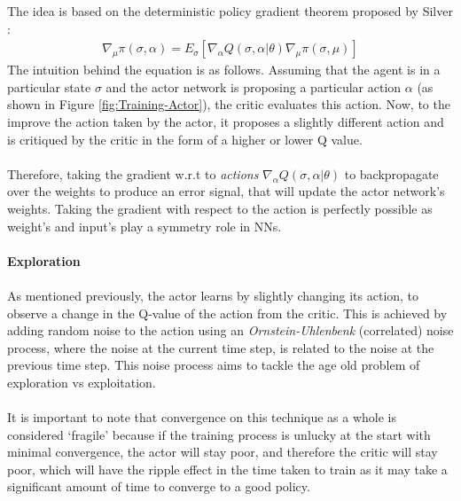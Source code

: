 \documentclass[ %
                    author={Ashwinder Khurana},
                supervisor={Prof Dave Cliff},
                    degree={MEng},
                     title={The Deeply Reinforced Trader},
                  subtitle={},
                      type={enterprise},
                      year={2020} ]{dissertation}
\begin{document}
{\begin{figure}[H]
\end{figure}
\noindent
The idea is based on the deterministic policy gradient theorem proposed by Silver \cite{Silver-theorem}:
\begin{equation}
\begin{split}
\nabla_\mu \pi(\sigma, \alpha) = E_\sigma [ \nabla_\alpha Q(\sigma, \alpha | \theta) \nabla_\mu \pi(\sigma,\mu)]
\end{split}
\end{equation}
\noindent
The intuition behind the equation is as follows. Assuming that the agent is in a particular state $\sigma$ and the actor network is proposing a particular action $\alpha$ (as shown in Figure \ref{fig:Training-Actor}), the critic evaluates this action. Now, to the improve the action taken by the actor, it proposes a slightly different action and is critiqued by the critic in the form of a higher or lower Q value. 
\\
\\
Therefore, taking the gradient w.r.t to \textit{actions} $\nabla_\alpha Q(\sigma,\alpha | \theta)$ to backpropagate over the weights to produce an error signal, that will update the actor network's weights. Taking the gradient with respect to the action is perfectly possible as weight's and input's play a symmetry role in NNs. 
\\
\\
\textbf{Exploration} 
\\
\\
As mentioned previously, the actor learns by slightly changing its action, to observe a change in the Q-value of the action from the critic. This is achieved by adding random noise to the action using an \textit{Ornstein-Uhlenbenk} (correlated) noise process, where the noise at the current time step, is related to the noise at the previous time step. This noise process aims to tackle the age old problem of exploration vs exploitation. 
\\
\\
It is important to note that convergence on this technique as a whole is considered \enquote*{fragile} because if the training process is unlucky at the start with minimal convergence, the actor will stay poor, and therefore the critic will stay poor, which will have the ripple effect in the time taken to train as it may take a significant amount of time to converge to a good policy. 

}
\end{document}
